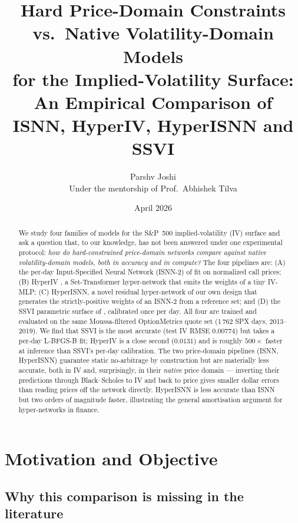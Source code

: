 \documentclass[11pt,a4paper]{article}
\title{Hard Price-Domain Constraints vs.\ Native Volatility-Domain Models \\
       for the Implied-Volatility Surface: \\
       \large An Empirical Comparison of ISNN, HyperIV, HyperISNN and SSVI}
\author{Parshv Joshi \\
        \small Under the mentorship of Prof.\ Abhishek Tilva}
\date{April 2026}
\begin{document}
\maketitle

\begin{abstract}
We study four families of models for the S\&P~500 implied-volatility (IV)
surface and ask a question that, to our knowledge, has not been answered
under one experimental protocol: \emph{how do hard-constrained
price-domain networks compare against native volatility-domain models, both
in accuracy and in compute?} The four pipelines are: (A) the per-day
Input-Specified Neural Network (ISNN-2) of \citet{jadoon2025isnn} fit on
normalized call prices; (B) HyperIV \citep{yang2025hyperiv}, a
Set-Transformer hyper-network that emits the weights of a tiny IV-MLP;
(C) HyperISNN, a novel residual hyper-network of our own design that
generates the strictly-positive weights of an ISNN-2 from a reference set;
and (D) the SSVI parametric surface of \citet{gatheral2014ssvi}, calibrated
once per day. All four are trained and evaluated on the same Moussa-filtered
\citep{moussa2025arbitrage} OptionMetrics quote set (1\,762 SPX days,
2013--2019). We find that SSVI is the most accurate (test IV RMSE
$0.00774$) but takes a per-day L-BFGS-B fit; HyperIV is a close second
($0.0131$) and is roughly $500\times$ faster at inference than SSVI's
per-day calibration. The two price-domain pipelines (ISNN, HyperISNN)
guarantee static no-arbitrage by construction but are materially less
accurate, both in IV and, surprisingly, in their \emph{native} price
domain --- inverting their predictions through Black--Scholes to IV and
back to price gives smaller dollar errors than reading prices off the
network directly. HyperISNN is less accurate than ISNN but two orders of
magnitude faster, illustrating the general amortisation argument for
hyper-networks in finance.
\end{abstract}

\tableofcontents
\bigskip

\section{Motivation and Objective}
\label{sec:motivation}

\subsection{Why this comparison is missing in the literature}
\end{document}
